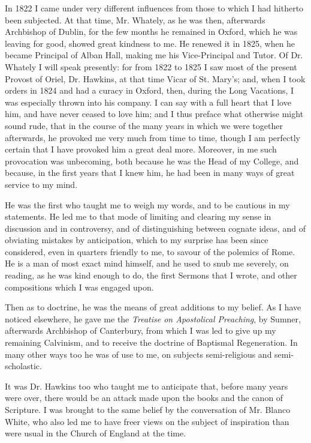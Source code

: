 In 1822 I came under very different influences from those to which
I had hitherto been subjected. At that time, Mr. Whately, as he was
then, afterwards Archbishop of Dublin, for the few months he remained
in Oxford, which he was leaving for good, showed great kindness to me.
He renewed it in 1825, when he became Principal of Alban Hall, making
me his Vice-Principal and Tutor. Of Dr. Whately I will speak
presently: for from 1822 to 1825 I saw most of the present Provost of
Oriel, Dr. Hawkins, at that time Vicar of St. Mary's; and, when I took
orders in 1824 and had a curacy in Oxford, then, during the Long Vacations, I was especially
thrown into his company. I can say with a full heart that I love him,
and have never ceased to love him; and I thus preface what otherwise
might sound rude, that in the course of the many years in which we
were together afterwards, he provoked me very much from time to time,
though I am perfectly certain that I have provoked him a great deal
more. Moreover, in me such provocation was unbecoming, both because he
was the Head of my College, and because, in the first years
that I knew him, he had been in many ways of great service to my mind.

He was the first who taught me to weigh my words, and to be
cautious in my statements. He led me to that mode of limiting and
clearing my sense in discussion and in controversy, and of
distinguishing between cognate ideas, and of obviating mistakes by
anticipation, which to my surprise has been since considered,
even in quarters friendly to me, to savour of the polemics of Rome. He
is a man of most exact mind himself, and he used to snub me severely,
on reading, as he was kind enough to do, the first Sermons that I
wrote, and other compositions which I was engaged upon.

Then as to doctrine, he was the means of great additions to my
belief. As I have noticed elsewhere, he gave me the \emph{Treatise on
Apostolical Preaching}, by Sumner, afterwards Archbishop of
Canterbury, from which I was led to give up my remaining Calvinism, and to receive the doctrine
of Baptismal Regeneration. In many other ways too he was of use to me,
on subjects semi-religious and semi-scholastic.

It was Dr. Hawkins too who taught me to anticipate that, before
many years were over, there would be an attack made upon the books and
the canon of Scripture. I was brought to the same belief by the
conversation of Mr. Blanco White, who also led me to have freer views
on the subject of inspiration than were usual in the Church of England
at the time.

